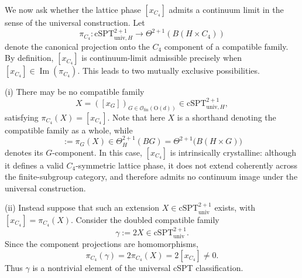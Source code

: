 \documentclass[aps,prx,reprint,superscriptaddress,twocolumn,amsmath,amssymb,amsfonts, nofootinbib]{revtex4-2}
\newcommand{\ofin}{\mathcal{O}_{\text{fin}}}
\theoremstyle{apsstyle}
\begin{document}
\bigskip

We now ask whether the lattice phase $[x_{C_{4}}]$ admits a continuum limit in the sense of the universal construction. Let
\begin{equation}
\pi_{C_4}: \mathrm{cSPT}^{2+1}_{\mathrm{univ},H}
\longrightarrow \Theta^{2+1}(B(H\times C_4))
\label{eq:C4_component_projection}
\end{equation}
denote the canonical projection onto the $C_4$ component of a compatible family. By definition, $[x_{C_{4}}]$ is continuum-limit admissible precisely when $[x_{C_{4}}]\in\operatorname{Im}(\pi_{C_4})$.
This leads to two mutually exclusive possibilities.

\bigskip 

\noindent (i) There may be no compatible family 
\begin{equation*}
X=\left([x_{G}]\right)_{G\in \ofin(\mathrm{O}(d))}\in \mathrm{cSPT}^{2+1}_{\mathrm{univ},H},
\end{equation*}
satisfying $\pi_{C_4}(X)=[x_{C_{4}}]$. Note that here $X$ is a shorthand denoting the compatible family as a whole, while
\begin{equation*}
[x_G]:=\pi_G(X) \in \Theta_H^{2+1}(BG) = \Theta^{2+1}\bigl(B(H\times G)\bigr)
\end{equation*}
denotes its $G$-component. In this case, $[x_{C_{4}}]$ is intrinsically crystalline: although it defines a valid $C_4$-symmetric lattice phase, it does not extend coherently across the finite-subgroup category, and therefore admits no continuum image under the universal construction.

\bigskip 

\noindent (ii) Instead suppose that such an extension $X\in \mathrm{cSPT}_{\mathrm{univ}}^{2+1}$ exists, with 
$[x_{C_4}]=\pi_{C_4}(X)$. Consider the doubled compatible family
\begin{equation}
\gamma:=2X\in \mathrm{cSPT}^{2+1}_{\mathrm{univ}}.
\label{eq:doubled_HOSPT_family}
\end{equation}
Since the component projections are homomorphisms,
\begin{equation}
\pi_{C_4}(\gamma) = 2\pi_{C_4}(X) = 2[x_{C_{4}}]
\neq0.
\label{eq:doubled_HOSPT_nonzero}
\end{equation}
Thus $\gamma$ is a nontrivial element of the universal cSPT classification.

\medskip 
\end{document}
